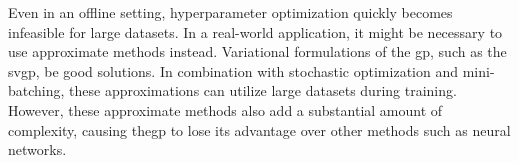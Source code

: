 Even in an offline setting, hyperparameter optimization quickly becomes infeasible for large datasets. In a real-world application, it might be necessary to use approximate methods instead. Variational formulations of the \acrshort{gp}, such as the \acrshort{svgp}, be good solutions. In combination with stochastic optimization and mini-batching, these approximations can utilize large datasets during training. However, these approximate methods also add a substantial amount of complexity, causing the\acrshort{gp} to lose its advantage over other methods such as neural networks.



